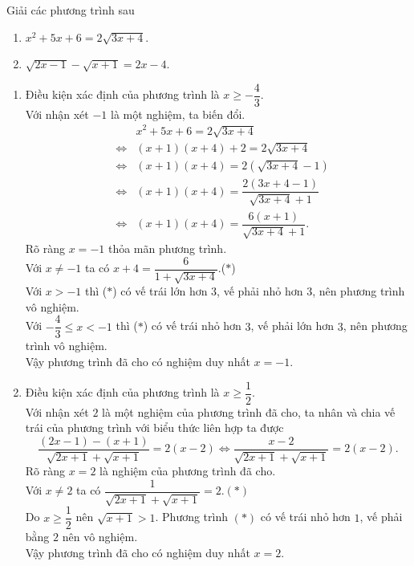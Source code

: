 \begin{vd}
	Giải các phương trình sau
	\begin{multicols}{2}
		\begin{enumerate}
			\item $x^2+5x+6=2\sqrt{3x+4}$.
			\item $\sqrt{2x-1}-\sqrt{x+1}=2x-4$.
		\end{enumerate}
	\end{multicols}
	\loigiai
	{
		\begin{enumerate}
			\item Điều kiện xác định của phương trình là $x\ge -\dfrac{4}{3}$.\\
			Với nhận xét $-1$ là một nghiệm, ta biến đổi.
			\begin{eqnarray*}
				&& x^2+5x+6=2\sqrt{3x+4}\\
				&\Leftrightarrow & \left(x+1\right)\left(x+4\right)+2=2\sqrt{3x+4}\\
				&\Leftrightarrow & \left(x+1\right)\left(x+4\right)=2\left(\sqrt{3x+4}-1\right)\\
				&\Leftrightarrow & \left(x+1\right)\left(x+4\right)=\dfrac{2(3x+4-1)}{\sqrt{3x+4}+1}\\
				&\Leftrightarrow & \left(x+1\right)\left(x+4\right)=\dfrac{6(x+1)}{\sqrt{3x+4}+1}.
			\end{eqnarray*}
			Rõ ràng $x=-1$ thỏa mãn phương trình.\\
			Với $x\ne -1$ ta có $x+4=\dfrac{6}{1+\sqrt{3x+4}}$.\hfill ($*$)\\
			Với $x>-1$ thì ($*$) có vế trái lớn hơn $3$, vế phải nhỏ hơn $3$, nên phương trình vô nghiệm.\\
			Với $-\dfrac{4}{3}\le x<-1$ thì ($*$) có vế trái nhỏ hơn $3$, vế phải lớn hơn $3$, nên phương trình vô nghiệm.\\
			Vậy phương trình đã cho có nghiệm duy nhất $x=-1$.
			\item Điều kiện xác định của phương trình là $x\ge \dfrac{1}{2}$.\\
			Với nhận xét $2$ là một nghiệm của phương trình đã cho, ta nhân và chia vế trái của phương trình với biểu thức liên hợp ta được
			$$ \dfrac{(2x-1)-(x+1)}{\sqrt{2x+1}+\sqrt{x+1}}=2(x-2)\Leftrightarrow \dfrac{x-2}{\sqrt{2x+1}+\sqrt{x+1}}=2(x-2). $$
			Rõ ràng $x=2$ là nghiệm của phương trình đã cho.\\
			Với $x\ne 2$ ta có $\dfrac{1}{\sqrt{2x+1}+\sqrt{x+1}}=2$.\hfill $(*)$\\
			Do $x\ge \dfrac{1}{2}$ nên $\sqrt{x+1}>1$. Phương trình $(*)$ có vế trái nhỏ hơn $1$, vế phải bằng $2$ nên vô nghiệm.\\
			Vậy phương trình đã cho có nghiệm duy nhất $x=2$.
		\end{enumerate}
	}
\end{vd}


